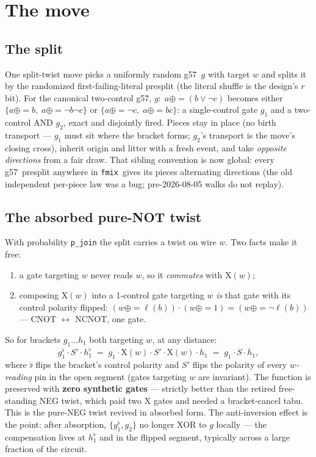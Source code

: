 \documentclass[11pt]{article}
\newcommand{\g}{\textsf{g57}}
\newcommand{\fmix}{\texttt{fmix}}
\newcommand{\X}{\mathrm{X}}
\begin{document}
\section{The move}

\subsection{The split}
One split-twist move picks a uniformly random \g\ $g$ with target $w$ and
splits it by the randomized first-failing-literal presplit (the literal
shuffle is the design's $r$ bit). For the canonical two-control \g,
$g:\; a \mathbin{\oplus\!=} (b \vee \lnot c)$ becomes either
$\{a \mathbin{\oplus\!=} b,\; a \mathbin{\oplus\!=} \lnot b\lnot c\}$ or
$\{a \mathbin{\oplus\!=} \lnot c,\; a \mathbin{\oplus\!=} bc\}$:
a single-control gate $g_1$ and a two-control AND $g_2$, exact and disjointly
fired. Pieces stay in place (no birth transport --- $g_1$ must sit where the
bracket forms; $g_2$'s transport is the move's closing cross), inherit origin
and litter with a fresh event, and take \emph{opposite directions} from a fair
draw. That sibling convention is now global: every \g\ presplit anywhere in
\fmix\ gives its pieces alternating directions (the old independent
per-piece law was a bug; pre-2026-08-05 walks do not replay).

\subsection{The absorbed pure-NOT twist}
With probability \texttt{p\_join} the split carries a twist on wire $w$.
Two facts make it free:
\begin{enumerate}
\item a gate targeting $w$ never reads $w$, so it \emph{commutes} with $\X(w)$;
\item composing $\X(w)$ into a 1-control gate targeting $w$ \emph{is} that gate
with its control polarity flipped:
$(w \mathbin{\oplus\!=} \ell(b)) \cdot (w \mathbin{\oplus\!=} 1) =
 (w \mathbin{\oplus\!=} \lnot\ell(b))$ --- CNOT $\leftrightarrow$ NCNOT, one gate.
\end{enumerate}
So for brackets $g_1 \dots h_1$ both targeting $w$, at any distance:
\[
g_1^\flat \cdot S' \cdot h_1^\flat
\;=\; g_1 \cdot \X(w) \cdot S' \cdot \X(w) \cdot h_1
\;=\; g_1 \cdot S \cdot h_1,
\]
where $\flat$ flips the bracket's control polarity and $S'$ flips the polarity
of every \emph{$w$-reading} pin in the open segment (gates targeting $w$ are
invariant). The function is preserved with \textbf{zero synthetic gates} ---
strictly better than the retired free-standing NEG twist, which paid two X
gates and needed a bracket-cancel tabu. This is the pure-NEG twist revived in
absorbed form. The anti-inversion effect is the point: after absorption,
$\{g_1^\flat, g_2\}$ no longer XOR to $g$ locally --- the compensation lives at
$h_1^\flat$ and in the flipped segment, typically across a large fraction of
the circuit.
\end{document}
